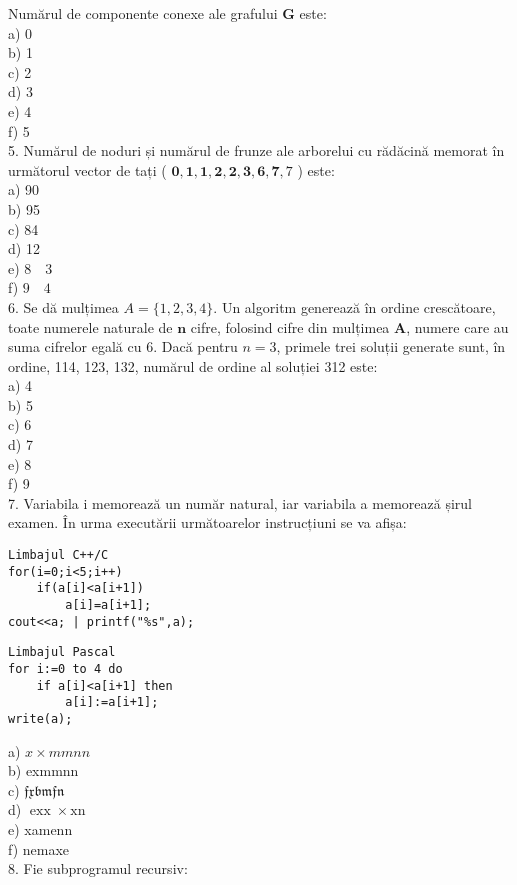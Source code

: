 Numărul de componente conexe ale grafului $\mathbf{G}$ este:\\
a) 0\\
b) 1\\
c) 2\\
d) 3\\
e) 4\\
f) 5\\
5. Numărul de noduri și numărul de frunze ale arborelui cu rădăcină memorat în următorul vector de tați ( $\mathbf{0}, \mathbf{1}, \mathbf{1}, \mathbf{2}, \mathbf{2}, \mathbf{3}, \mathbf{6}, \mathbf{7}, 7$ ) este:\\
a) 90\\
b) 95\\
c) 84\\
d) 12\\
e) $8 \quad 3$\\
f) $9 \quad 4$\\
6. Se dă mulțimea $A=\{1,2,3,4\}$. Un algoritm generează în ordine crescătoare, toate numerele naturale de $\mathbf{n}$ cifre, folosind cifre din mulțimea $\mathbf{A}$, numere care au suma cifrelor egală cu 6. Dacă pentru $n=3$, primele trei soluții generate sunt, în ordine, 114, 123, 132, numărul de ordine al soluției 312 este:\\
a) 4\\
b) 5\\
c) 6\\
d) 7\\
e) 8\\
f) 9\\
7. Variabila i memorează un număr natural, iar variabila a memorează șirul examen. În urma executării următoarelor instrucțiuni se va afișa:

\begin{verbatim}
Limbajul C++/C
for(i=0;i<5;i++)
    if(a[i]<a[i+1])
        a[i]=a[i+1];
cout<<a; | printf("%s",a);
\end{verbatim}

\begin{verbatim}
Limbajul Pascal
for i:=0 to 4 do
    if a[i]<a[i+1] then
        a[i]:=a[i+1];
write(a);
\end{verbatim}

a) $x \times m m n n$\\
b) exmmnn\\
c) $\mathfrak{f x b m f n}$\\
d) $\operatorname{exx} \times \mathrm{xn}$\\
e) xamenn\\
f) nemaxe\\
8. Fie subprogramul recursiv:

